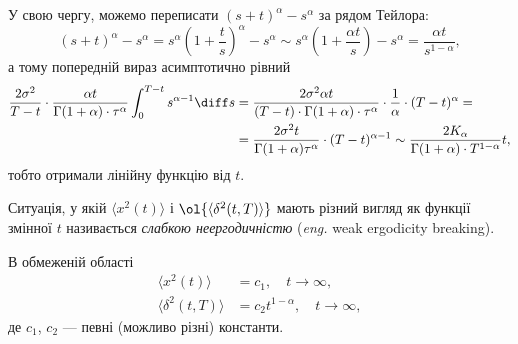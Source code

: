 У свою чергу, можемо переписати $(s + t)^\alpha - s^\alpha$ за рядом Тейлора:
\begin{equation}
    (s + t)^\alpha - s^\alpha
    = s^\alpha \left( 1 + \frac{t}{s} \right)^\alpha - s^\alpha
    \sim s^\alpha \left( 1 + \frac{\alpha t}{s} \right) - s^\alpha
    = \frac{\alpha t}{s^{1 - \alpha}},
\end{equation}
а тому попередній вираз асимптотично рівний
\begin{equation}
    \begin{aligned}
        \frac{2 \sigma^2}{T - t} \cdot \frac{\alpha t}{\Gamma(1 + \alpha) \cdot \tau^\alpha} \int_0^{T - t} s^{\alpha - 1} \diff s
        &= \frac{2 \sigma^2 \alpha t}{(T - t) \cdot \Gamma(1 + \alpha) \cdot \tau^\alpha} \cdot \frac{1}{\alpha} \cdot (T - t)^\alpha = \\
        &= \frac{2 \sigma^2 t}{\Gamma(1 + \alpha) \tau^\alpha} \cdot (T - t)^{\alpha - 1} \sim \frac{2 K_\alpha}{\Gamma(1 + \alpha) \cdot T^{1 - \alpha}} t,
    \end{aligned}
\end{equation}
тобто отримали лінійну функцію від $t$. \medskip

\begin{definition}
    Ситуація, у якій $\langle x^2(t) \rangle$ і $\ol{\langle \delta^2(t, T) \rangle}$ мають різний вигляд як функції змінної $t$ називається \textit{слабкою неергодичністю} (\textit{eng.} weak ergodicity breaking).
\end{definition}

\begin{remark}
    В обмеженій області
    \begin{align}
        \langle x^2(t) \rangle &= c_1, \quad t \to \infty, \\
        \langle \delta^2(t, T) \rangle &= c_2 t^{1 - \alpha}, \quad t \to \infty,
    \end{align}
    де $c_1$, $c_2$ --- певні (можливо різні) константи.
\end{remark}


